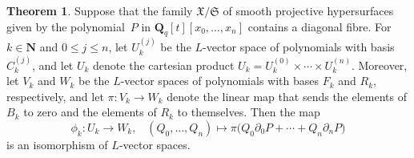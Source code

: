 \documentclass[a4paper,11pt]{article}
\numberwithin{equation}{section}
\newcommand{\NN}{\mathbf{N}} %
\newcommand{\QQ}{\mathbf{Q}} %
\renewcommand{\to}{\rightarrow}        %
\theoremstyle{definition}
\newtheorem{thm}{Theorem}[section]
\begin{document}
\begin{thm} \label{thm:Isomorphism}
Suppose that the family $\mathfrak{X}/\mathfrak{S}$ of smooth projective
hypersurfaces given by the polynomial~$P$ in $\QQ_q[t][x_0, \dotsc, x_n]$ contains 
a diagonal fibre.  For $k \in \NN$ and $0 \leq j \leq n$, let $U_k^{(j)}$ be 
the $L$-vector space of polynomials with basis $C_k^{(j)}$, and let $U_k$ 
denote the cartesian product $U_k = U_k^{(0)} \times \dotsb \times U_k^{(n)}$. 
Moreover, let $V_k$ and $W_k$ be the $L$-vector spaces of polynomials with 
bases $F_k$ and $R_k$, respectively, and let $\pi \colon V_k \rightarrow W_k$ 
denote the linear map that sends the elements of $B_k$ to zero and the 
elements of $R_k$ to themselves. %
Then the map 
\begin{equation}
\phi_k \colon U_k \to W_k, \; \; \;
(Q_0, \dotsc, Q_n) \mapsto \pi \bigl( Q_0 \partial_0 P + \dotsb + Q_n \partial_n P \bigr)
\end{equation}
is an isomorphism of $L$-vector spaces.
\end{thm}
\end{document}
